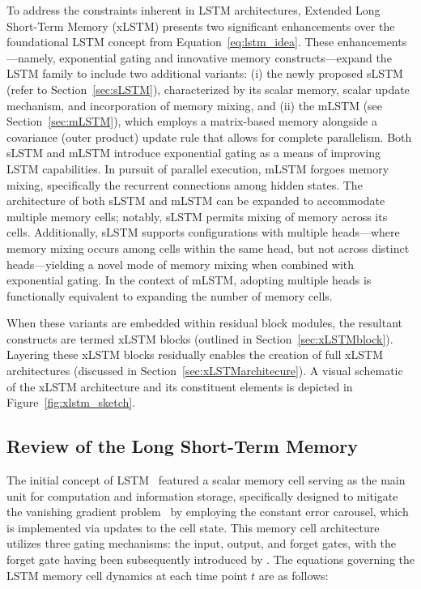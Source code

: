 To address the constraints inherent in LSTM architectures, Extended Long Short-Term Memory (xLSTM) presents two significant enhancements over the foundational LSTM concept from Equation~\eqref{eq:lstm_idea}. These enhancements—namely, exponential gating and innovative memory constructs—expand the LSTM family to include two additional variants: (i) the newly proposed sLSTM (refer to Section~\ref{sec:sLSTM}), characterized by its scalar memory, scalar update mechanism, and incorporation of memory mixing, and (ii) the mLSTM (see Section~\ref{sec:mLSTM}), which employs a matrix-based memory alongside a covariance (outer product) update rule that allows for complete parallelism. Both sLSTM and mLSTM introduce exponential gating as a means of improving LSTM capabilities. In pursuit of parallel execution, mLSTM forgoes memory mixing, specifically the recurrent connections among hidden states. The architecture of both sLSTM and mLSTM can be expanded to accommodate multiple memory cells; notably, sLSTM permits mixing of memory across its cells. Additionally, sLSTM supports configurations with multiple heads—where memory mixing occurs among cells within the same head, but not across distinct heads—yielding a novel mode of memory mixing when combined with exponential gating. In the context of mLSTM, adopting multiple heads is functionally equivalent to expanding the number of memory cells.

When these variants are embedded within residual block modules, the resultant constructs are termed xLSTM blocks (outlined in Section~\ref{sec:xLSTMblock}). Layering these xLSTM blocks residually enables the creation of full xLSTM architectures (discussed in Section~\ref{sec:xLSTMarchitecure}). A visual schematic of the xLSTM architecture and its constituent elements is depicted in Figure~\ref{fig:xlstm_sketch}.

\subsection{Review of the Long Short-Term Memory}
\label{sec:orgLSTM}

The initial concept of LSTM~\citep{Hochreiter:91,Hochreiter:97nips,Hochreiter:97} featured a scalar memory cell serving as the main unit for computation and information storage, specifically designed to mitigate the vanishing gradient problem~\citep{Hochreiter:91,Hochreiter:00book} by employing the constant error carousel, which is implemented via updates to the cell state. This memory cell architecture utilizes three gating mechanisms: the input, output, and forget gates, with the forget gate having been subsequently introduced by \citet{Gers:00}. The equations governing the LSTM memory cell dynamics at each time point $t$ are as follows:

